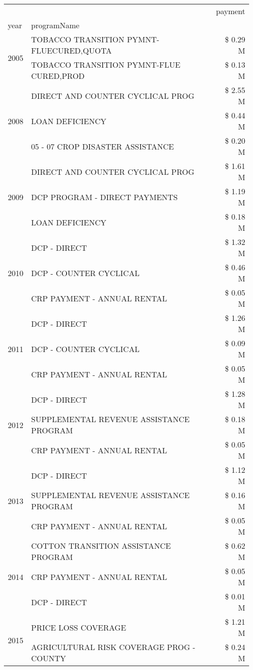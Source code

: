 \begin{tabular}{llr}
\toprule
 &  & payment \\
year & programName &  \\
\midrule
\multirow[t]{2}{*}{2005} & TOBACCO TRANSITION PYMNT-FLUECURED,QUOTA & \$ 0.29 M \\
 & TOBACCO TRANSITION PYMNT-FLUE CURED,PROD & \$ 0.13 M \\
\cline{1-3}
\multirow[t]{3}{*}{2008} & DIRECT AND COUNTER CYCLICAL PROG & \$ 2.55 M \\
 & LOAN DEFICIENCY & \$ 0.44 M \\
 & 05 - 07 CROP DISASTER ASSISTANCE & \$ 0.20 M \\
\cline{1-3}
\multirow[t]{3}{*}{2009} & DIRECT AND COUNTER CYCLICAL PROG & \$ 1.61 M \\
 & DCP PROGRAM - DIRECT PAYMENTS & \$ 1.19 M \\
 & LOAN DEFICIENCY & \$ 0.18 M \\
\cline{1-3}
\multirow[t]{3}{*}{2010} & DCP - DIRECT & \$ 1.32 M \\
 & DCP - COUNTER CYCLICAL & \$ 0.46 M \\
 & CRP PAYMENT - ANNUAL RENTAL & \$ 0.05 M \\
\cline{1-3}
\multirow[t]{3}{*}{2011} & DCP - DIRECT & \$ 1.26 M \\
 & DCP - COUNTER CYCLICAL & \$ 0.09 M \\
 & CRP PAYMENT - ANNUAL RENTAL & \$ 0.05 M \\
\cline{1-3}
\multirow[t]{3}{*}{2012} & DCP - DIRECT & \$ 1.28 M \\
 & SUPPLEMENTAL REVENUE ASSISTANCE PROGRAM & \$ 0.18 M \\
 & CRP PAYMENT - ANNUAL RENTAL & \$ 0.05 M \\
\cline{1-3}
\multirow[t]{3}{*}{2013} & DCP - DIRECT & \$ 1.12 M \\
 & SUPPLEMENTAL REVENUE ASSISTANCE PROGRAM & \$ 0.16 M \\
 & CRP PAYMENT - ANNUAL RENTAL & \$ 0.05 M \\
\cline{1-3}
\multirow[t]{3}{*}{2014} & COTTON TRANSITION ASSISTANCE PROGRAM & \$ 0.62 M \\
 & CRP PAYMENT - ANNUAL RENTAL & \$ 0.05 M \\
 & DCP - DIRECT & \$ 0.01 M \\
\cline{1-3}
\multirow[t]{3}{*}{2015} & PRICE LOSS COVERAGE & \$ 1.21 M \\
 & AGRICULTURAL RISK COVERAGE PROG - COUNTY & \$ 0.24 M \\

\end{tabular}
